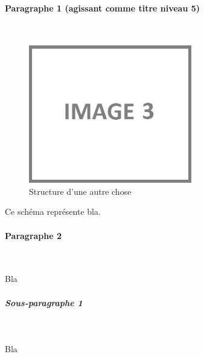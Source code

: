 \paragraph{Paragraphe 1 (agissant comme titre niveau 5)}
~\\
\hskip7mm

\begin{figure}[!ht]
\begin{center}
\includegraphics[height=6cm]{autre_partie/image3}
\end{center}
\caption[Structure d'unz autre chose]{Structure d'une autre chose\protect\footnotemark}
\end{figure}

Ce schéma représente bla.


\paragraph{Paragraphe 2}
~\\
\hskip7mm


Bla

\subparagraph{Sous-paragraphe 1}
~\\
\hskip7mm

Bla

